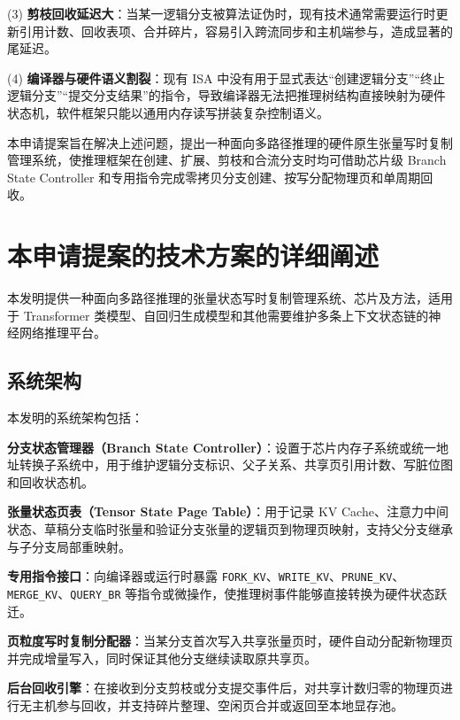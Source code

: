\documentclass[12pt,a4paper]{article}
\begin{document}
(3) \textbf{剪枝回收延迟大}：当某一逻辑分支被算法证伪时，现有技术通常需要运行时更新引用计数、回收表项、合并碎片，容易引入跨流同步和主机端参与，造成显著的尾延迟。

(4) \textbf{编译器与硬件语义割裂}：现有 ISA 中没有用于显式表达“创建逻辑分支”“终止逻辑分支”“提交分支结果”的指令，导致编译器无法把推理树结构直接映射为硬件状态机，软件框架只能以通用内存读写拼装复杂控制语义。

本申请提案旨在解决上述问题，提出一种面向多路径推理的硬件原生张量写时复制管理系统，使推理框架在创建、扩展、剪枝和合流分支时均可借助芯片级 Branch State Controller 和专用指令完成零拷贝分支创建、按写分配物理页和单周期回收。

\section{本申请提案的技术方案的详细阐述}

本发明提供一种面向多路径推理的张量状态写时复制管理系统、芯片及方法，适用于 Transformer 类模型、自回归生成模型和其他需要维护多条上下文状态链的神经网络推理平台。

\subsection{系统架构}

本发明的系统架构包括：

\textbf{分支状态管理器（Branch State Controller）}：设置于芯片内存子系统或统一地址转换子系统中，用于维护逻辑分支标识、父子关系、共享页引用计数、写脏位图和回收状态机。

\textbf{张量状态页表（Tensor State Page Table）}：用于记录 KV Cache、注意力中间状态、草稿分支临时张量和验证分支张量的逻辑页到物理页映射，支持父分支继承与子分支局部重映射。

\textbf{专用指令接口}：向编译器或运行时暴露 \texttt{FORK\_KV}、\texttt{WRITE\_KV}、\texttt{PRUNE\_KV}、\texttt{MERGE\_KV}、\texttt{QUERY\_BR} 等指令或微操作，使推理树事件能够直接转换为硬件状态跃迁。

\textbf{页粒度写时复制分配器}：当某分支首次写入共享张量页时，硬件自动分配新物理页并完成增量写入，同时保证其他分支继续读取原共享页。

\textbf{后台回收引擎}：在接收到分支剪枝或分支提交事件后，对共享计数归零的物理页进行无主机参与回收，并支持碎片整理、空闲页合并或返回至本地显存池。
\end{document}

